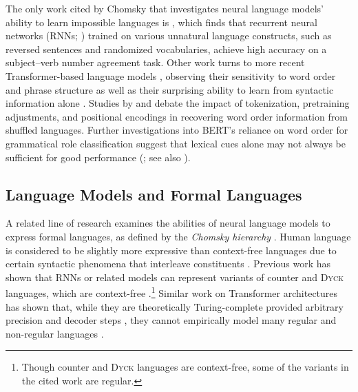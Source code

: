 \documentclass[11pt]{article}
\begin{document}
The only work cited by Chomsky that investigates neural language models' ability to learn impossible languages is \citealt{mitchell-bowers-2020-priorless}, which finds that recurrent neural networks (RNNs; \citealp{elman1990finding}) trained on various unnatural language constructs, such as reversed sentences and randomized vocabularies, achieve high accuracy on a subject--verb number agreement task.
Other work turns to more recent Transformer-based language models \cite{vaswani2017attention}, observing their sensitivity to word order and phrase structure \cite{alleman-etal-2021-syntactic, galke2023makes} as well as their surprising ability to learn from syntactic information alone \cite{huang2023lexinvariant}.
Studies by \citet{sinha-etal-2021-masked} and \citet{abdou-etal-2022-word} debate the impact of tokenization, pretraining adjustments, and positional encodings in recovering word order information from shuffled languages.
Further investigations into BERT's \cite{devlin-etal-2019-bert} reliance on word order for grammatical role classification suggest that lexical cues alone may not always be sufficient for good performance (\citealp{papadimitriou-etal-2022-classifying-grammatical}; see also \citealp{hessel-schofield-2021-effective, pham-etal-2021-order}).

\subsection{Language Models and Formal Languages}

A related line of research examines the abilities of neural language models to express formal languages, as defined by the \emph{Chomsky hierarchy}
\cite{chomsky1956models,chomsky1959certain}. Human language is considered to be slightly more expressive than context-free languages due to certain syntactic phenomena that interleave constituents \cite{shieber1985evidence,joshi1985TAG}.
Previous work has shown that RNNs or related models can represent variants of counter and \textsc{Dyck} languages, which are context-free \cite{weiss-etal-2018-practical, merrill-2019-sequential, merrill-etal-2020-formal, hewitt-etal-2020-rnns}.\footnote{Though counter and \textsc{Dyck} languages are context-free, some of the variants in the cited work are regular.}
Similar work on Transformer architectures has shown that, while they are theoretically Turing-complete provided arbitrary precision and decoder steps \cite{perez2021attention}, they cannot empirically model many regular and non-regular languages \cite{hahn2020theoretical, ebrahimi-etal-2020-self, deletang2023neural}.
\end{document}
